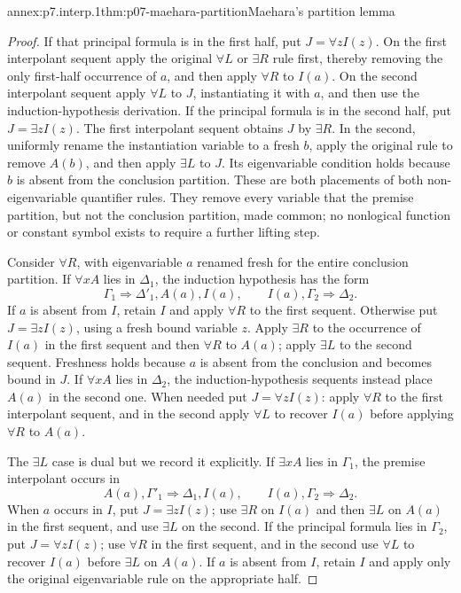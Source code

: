 \begin{annexitem}{annex:p7.interp.1}{thm:p07-maehara-partition}{Maehara's partition lemma}
\begin{proof}
If that principal formula is in the first half, put
\(J=\forall zI(z)\).  On the first interpolant sequent apply the original
\(\forall L\) or \(\exists R\) rule first, thereby removing the only
first-half occurrence of \(a\), and then apply \(\forall R\) to \(I(a)\).
On the second interpolant sequent apply \(\forall L\) to \(J\), instantiating
it with \(a\), and then use the induction-hypothesis derivation.  If the
principal formula is in the second half, put \(J=\exists zI(z)\).  The first
interpolant sequent obtains \(J\) by \(\exists R\).  In the second, uniformly
rename the instantiation variable to a fresh \(b\), apply the original rule to
remove \(A(b)\), and then apply \(\exists L\) to \(J\).  Its eigenvariable
condition holds because \(b\) is absent from the conclusion partition.
These are both placements of both non-eigenvariable quantifier rules.  They
remove every variable that the premise partition, but not the conclusion
partition, made common; no nonlogical function or constant symbol exists to
require a further lifting step.

Consider \(\forall R\), with eigenvariable \(a\) renamed fresh for the entire
conclusion partition.  If \(\forall xA\) lies in \(\Delta_1\), the induction
hypothesis has the form
\[
 \Gamma_1\Rightarrow\Delta'_1,A(a),I(a),
 \qquad
 I(a),\Gamma_2\Rightarrow\Delta_2.
\]
If \(a\) is absent from \(I\), retain \(I\) and apply \(\forall R\) to the
first sequent.  Otherwise put \(J=\exists zI(z)\), using a fresh bound
variable \(z\).  Apply \(\exists R\) to the occurrence of \(I(a)\) in the
first sequent and then \(\forall R\) to \(A(a)\); apply \(\exists L\) to the
second sequent.  Freshness holds because \(a\) is absent from the conclusion
and becomes bound in \(J\).  If \(\forall xA\) lies in \(\Delta_2\), the
induction-hypothesis sequents instead place \(A(a)\) in the second one.  When
needed put \(J=\forall zI(z)\): apply \(\forall R\) to the first interpolant
sequent, and in the second apply \(\forall L\) to recover \(I(a)\) before
applying \(\forall R\) to \(A(a)\).

The \(\exists L\) case is dual but we record it explicitly.  If
\(\exists xA\) lies in \(\Gamma_1\), the premise interpolant occurs in
\[
 A(a),\Gamma'_1\Rightarrow\Delta_1,I(a),
 \qquad
 I(a),\Gamma_2\Rightarrow\Delta_2.
\]
When \(a\) occurs in \(I\), put \(J=\exists zI(z)\); use \(\exists R\) on
\(I(a)\) and then \(\exists L\) on \(A(a)\) in the first sequent, and use
\(\exists L\) on the second.  If the principal formula lies in
\(\Gamma_2\), put \(J=\forall zI(z)\); use \(\forall R\) in the first
sequent, and in the second use \(\forall L\) to recover \(I(a)\) before
\(\exists L\) on \(A(a)\).  If \(a\) is absent from \(I\), retain \(I\)
and apply only the original eigenvariable rule on the appropriate half.


\end{proof}
\end{annexitem}
